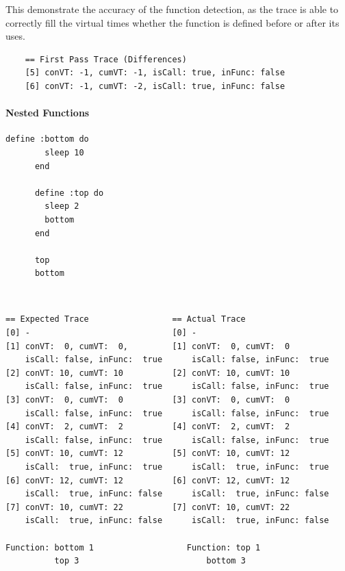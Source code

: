 \documentclass[11pt, abstracton, twoside, titlepage=true]{scrartcl}
\begin{document}
This demonstrate the accuracy of the function detection, as 
the trace is able to correctly fill the virtual times whether the function is 
defined before or after its uses.
\\
\begin{lstlisting}
    == First Pass Trace (Differences)
    [5] conVT: -1, cumVT: -1, isCall: true, inFunc: false 
    [6] conVT: -1, cumVT: -2, isCall: true, inFunc: false 
\end{lstlisting}

\paragraph{Nested Functions}
\begin{minipage}{\textwidth}
	\begin{lstlisting}[style = sonicpi]
      define :bottom do
        sleep 10
      end
    
      define :top do      
        sleep 2
        bottom
      end

      top
      bottom
	\end{lstlisting}
\end{minipage}
\\
\begin{lstlisting}
== Expected Trace                 == Actual Trace
[0] -                             [0] -
[1] conVT:  0, cumVT:  0,         [1] conVT:  0, cumVT:  0
    isCall: false, inFunc:  true      isCall: false, inFunc:  true            
[2] conVT: 10, cumVT: 10          [2] conVT: 10, cumVT: 10
    isCall: false, inFunc:  true      isCall: false, inFunc:  true 
[3] conVT:  0, cumVT:  0          [3] conVT:  0, cumVT:  0
    isCall: false, inFunc:  true      isCall: false, inFunc:  true 
[4] conVT:  2, cumVT:  2          [4] conVT:  2, cumVT:  2
    isCall: false, inFunc:  true      isCall: false, inFunc:  true 
[5] conVT: 10, cumVT: 12          [5] conVT: 10, cumVT: 12
    isCall:  true, inFunc:  true      isCall:  true, inFunc:  true 
[6] conVT: 12, cumVT: 12          [6] conVT: 12, cumVT: 12
    isCall:  true, inFunc: false      isCall:  true, inFunc: false 
[7] conVT: 10, cumVT: 22          [7] conVT: 10, cumVT: 22
    isCall:  true, inFunc: false      isCall:  true, inFunc: false 

Function: bottom 1                   Function: top 1
          top 3                          bottom 3
\end{lstlisting}
\end{document}
